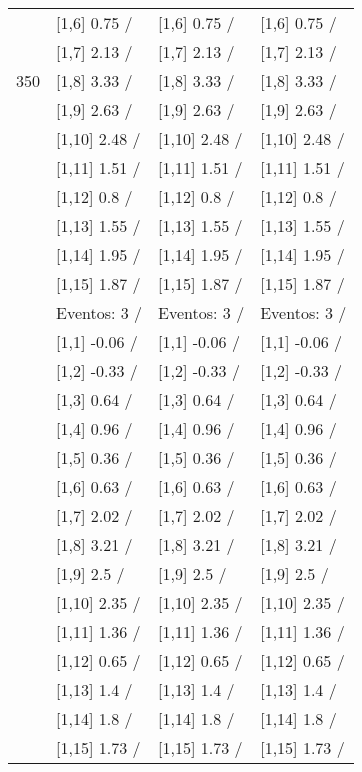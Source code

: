 \begin{table}
\begin{tabular}[t]{llll}
 & {}[1,6] 0.75  / & {}[1,6] 0.75  / & {}[1,6] 0.75  /\\
 & {}[1,7] 2.13  / & {}[1,7] 2.13  / & {}[1,7] 2.13  /\\
350 & {}[1,8] 3.33  / & {}[1,8] 3.33  / & {}[1,8] 3.33  /\\
\addlinespace
 & {}[1,9] 2.63  / & {}[1,9] 2.63  / & {}[1,9] 2.63  /\\
 & {}[1,10] 2.48  / & {}[1,10] 2.48  / & {}[1,10] 2.48  /\\
 & {}[1,11] 1.51  / & {}[1,11] 1.51  / & {}[1,11] 1.51  /\\
 & {}[1,12] 0.8  / & {}[1,12] 0.8  / & {}[1,12] 0.8  /\\
 & {}[1,13] 1.55  / & {}[1,13] 1.55  / & {}[1,13] 1.55  /\\
\addlinespace
 & {}[1,14] 1.95  / & {}[1,14] 1.95  / & {}[1,14] 1.95  /\\
 & {}[1,15] 1.87  / & {}[1,15] 1.87  / & {}[1,15] 1.87  /\\
 & Eventos:  3 / & Eventos:  3 / & Eventos:  3 /\\
 & {}[1,1] -0.06  / & {}[1,1] -0.06  / & {}[1,1] -0.06  /\\
 & {}[1,2] -0.33  / & {}[1,2] -0.33  / & {}[1,2] -0.33  /\\
\addlinespace
 & {}[1,3] 0.64  / & {}[1,3] 0.64  / & {}[1,3] 0.64  /\\
 & {}[1,4] 0.96  / & {}[1,4] 0.96  / & {}[1,4] 0.96  /\\
 & {}[1,5] 0.36  / & {}[1,5] 0.36  / & {}[1,5] 0.36  /\\
 & {}[1,6] 0.63  / & {}[1,6] 0.63  / & {}[1,6] 0.63  /\\
 & {}[1,7] 2.02  / & {}[1,7] 2.02  / & {}[1,7] 2.02  /\\
\addlinespace
500 & {}[1,8] 3.21  / & {}[1,8] 3.21  / & {}[1,8] 3.21  /\\
 & {}[1,9] 2.5  / & {}[1,9] 2.5  / & {}[1,9] 2.5  /\\
 & {}[1,10] 2.35  / & {}[1,10] 2.35  / & {}[1,10] 2.35  /\\
 & {}[1,11] 1.36  / & {}[1,11] 1.36  / & {}[1,11] 1.36  /\\
 & {}[1,12] 0.65  / & {}[1,12] 0.65  / & {}[1,12] 0.65  /\\
\addlinespace
 & {}[1,13] 1.4  / & {}[1,13] 1.4  / & {}[1,13] 1.4  /\\
 & {}[1,14] 1.8  / & {}[1,14] 1.8  / & {}[1,14] 1.8  /\\
 & {}[1,15] 1.73  / & {}[1,15] 1.73  / & {}[1,15] 1.73  /\\
\bottomrule
\end{tabular}
\end{table}
